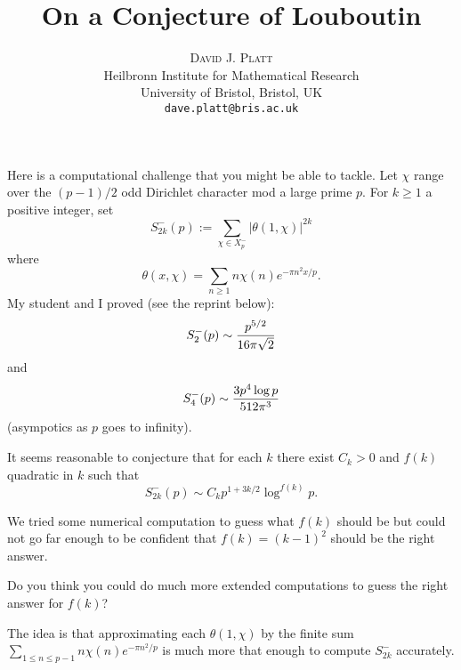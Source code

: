 \documentclass[12pt]{extarticle}
\begin{document}
\nocite{*}

\title{\bf On a Conjecture of Louboutin}

\author{\textsc{David J. Platt} \\ 
 Heilbronn Institute for Mathematical Research\\
University of Bristol, Bristol, UK \\ 
\texttt{dave.platt@bris.ac.uk}}
\date{}

\maketitle

\begin{abstract}
\end{abstract}

Here is a computational challenge that you might be able to tackle.
Let $\chi$ range over the $(p-1)/2$ odd Dirichlet character mod a large prime $p$.
For $k\geq 1$ a positive integer,
set
$$S_{2k}^-(p):=\sum_{\chi\in X_p^-}\vert\theta (1,\chi)\vert^{2k}$$
where
$$\theta (x,\chi)=\sum_{n\geq 1} n\chi (n)e^{-\pi n^2x/p}.$$
My student and I proved (see the reprint below):
$$S_2^-(p)\sim {p^{5/2}\over 16\pi\sqrt 2}$$
and
$$S_4^-(p)\sim {3p^4\log p\over 512\pi^3}$$
(asympotics as $p$ goes to infinity).

It seems reasonable to conjecture that for each $k$ there exist $C_k>0$ and $f(k)$ quadratic in $k$ such that
$$S_{2k}^-(p)\sim C_kp^{1+3k/2}\log^{f(k)} p.$$

We tried some numerical computation to guess what $f(k)$ should be
but could not go far enough to be confident that $f(k) =(k-1)^2$ should be the right answer.


Do you think you could do much more extended computations to guess the right answer for $f(k)$?

The idea is that approximating each $\theta (1,\chi)$ by the finite sum $\sum_{1\leq n\leq p-1} n\chi (n)e^{-\pi n^2/p}$
is much more that enough to compute $S_{2k}^-$ accurately.



%

%
\end{document}
